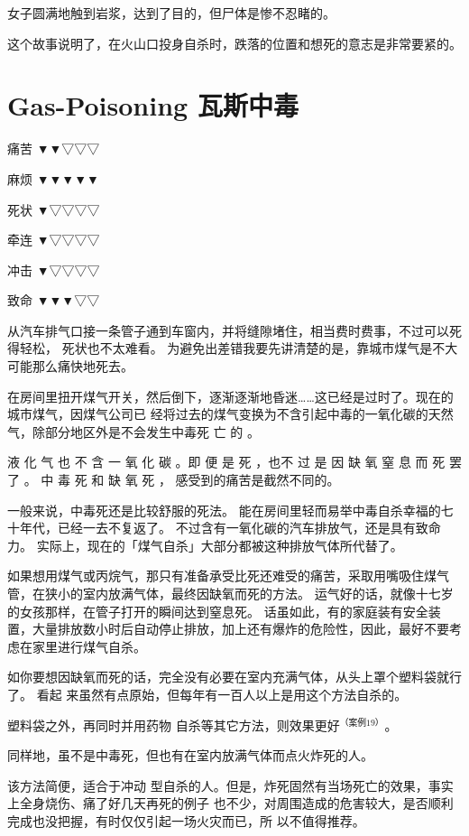 \documentclass[UTF8]{ctexart}
\begin{document}
女子圆满地触到岩浆，达到了目的，但尸体是惨不忍睹的。

这个故事说明了，在火山口投身自杀时，跌落的位置和想死的意志是非常要紧的。

\newpage

\section{Gas-Poisoning 瓦斯中毒}

痛苦 ▼▼▽▽▽

麻烦 ▼▼▼▼▼

死状 ▼▽▽▽▽

牵连 ▼▽▽▽▽

冲击 ▼▽▽▽▽

致命 ▼▼▼▽▽

从汽车排气口接一条管子通到车窗内，并将缝隙堵住，相当费时费事，不过可以死得轻松， 死状也不太难看。 
为避免出差错我要先讲清楚的是，靠城市煤气是不大可能那么痛快地死去。

在房间里扭开煤气开关，然后倒下，逐渐逐渐地昏迷……这已经是过时了。现在的城市煤气，因煤气公司已 经将过去的煤气变换为不含引起中毒的一氧化碳的天然气，除部分地区外是不会发生中毒死 亡 的 。

液 化 气 也 不 含 一 氧 化 碳 。即 便 是 死 ，也不 过 是 因 缺 氧 窒 息 而 死 罢 了 。
中 毒 死 和 缺 氧 死 ， 感受到的痛苦是截然不同的。

一般来说，中毒死还是比较舒服的死法。
能在房间里轻而易举中毒自杀幸福的七十年代，已经一去不复返了。 
不过含有一氧化碳的汽车排放气，还是具有致命力。
实际上，现在的「煤气自杀」大部分都被这种排放气体所代替了。

如果想用煤气或丙烷气，那只有准备承受比死还难受的痛苦，采取用嘴吸住煤气管，在狭小的室内放满气体，最终因缺氧而死的方法。
运气好的话，就像十七岁的女孩那样，在管子打开的瞬间达到窒息死。
话虽如此，有的家庭装有安全装置，大量排放数小时后自动停止排放，加上还有爆炸的危险性，因此，最好不要考虑在家里进行煤气自杀。

如你要想因缺氧而死的话，完全没有必要在室内充满气体，从头上罩个塑料袋就行了。
看起 来虽然有点原始，但每年有一百人以上是用这个方法自杀的。

塑料袋之外，再同时并用药物 自杀等其它方法，则效果更好$^{（案例 19）}$。
 
同样地，虽不是中毒死，但也有在室内放满气体而点火炸死的人。

该方法简便，适合于冲动 型自杀的人。但是，炸死固然有当场死亡的效果，事实上全身烧伤、痛了好几天再死的例子 也不少，对周围造成的危害较大，是否顺利完成也没把握，有时仅仅引起一场火灾而已，所 以不值得推荐。
\end{document}
